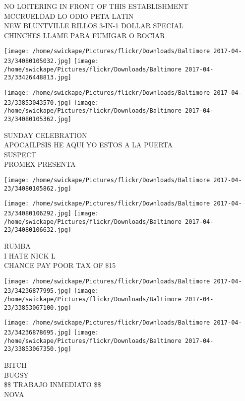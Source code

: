 \documentclass[10pt,letterpaper]{article}
\begin{document}
NO LOITERING IN FRONT OF THIS ESTABLISHMENT\\
MCCRUELDAD LO ODIO PETA LATIN\\
NEW BLUNTVILLE RILLOS 3{-}IN{-}1 DOLLAR SPECIAL\\
CHINCHES LLAME PARA FUMIGAR O ROCIAR\\
\pagebreak

\texttt{[image: /home/swickape/Pictures/flickr/Downloads/Baltimore 2017-04-23/34080105032.jpg]}
\texttt{[image: /home/swickape/Pictures/flickr/Downloads/Baltimore 2017-04-23/33426448813.jpg]}

\texttt{[image: /home/swickape/Pictures/flickr/Downloads/Baltimore 2017-04-23/33853043570.jpg]}
\texttt{[image: /home/swickape/Pictures/flickr/Downloads/Baltimore 2017-04-23/34080105362.jpg]}

SUNDAY CELEBRATION\\
APOCAILPSIS HE AQUI YO ESTOS A LA PUERTA\\
SUSPECT\\
PROMEX PRESENTA\\
\pagebreak

\texttt{[image: /home/swickape/Pictures/flickr/Downloads/Baltimore 2017-04-23/34080105862.jpg]}

\vspace{0.25in}
\texttt{[image: /home/swickape/Pictures/flickr/Downloads/Baltimore 2017-04-23/34080106292.jpg]}
\texttt{[image: /home/swickape/Pictures/flickr/Downloads/Baltimore 2017-04-23/34080106632.jpg]}

RUMBA\\
I HATE NICK L\\
CHANCE PAY POOR TAX OF \$15\\
\pagebreak

\texttt{[image: /home/swickape/Pictures/flickr/Downloads/Baltimore 2017-04-23/34236877995.jpg]}
\texttt{[image: /home/swickape/Pictures/flickr/Downloads/Baltimore 2017-04-23/33853067100.jpg]}

\texttt{[image: /home/swickape/Pictures/flickr/Downloads/Baltimore 2017-04-23/34236878695.jpg]}
\texttt{[image: /home/swickape/Pictures/flickr/Downloads/Baltimore 2017-04-23/33853067350.jpg]}

BITCH\\
BUGSY\\
\$\$ TRABAJO INMEDIATO \$\$\\
NOVA\\
\pagebreak
\end{document}
